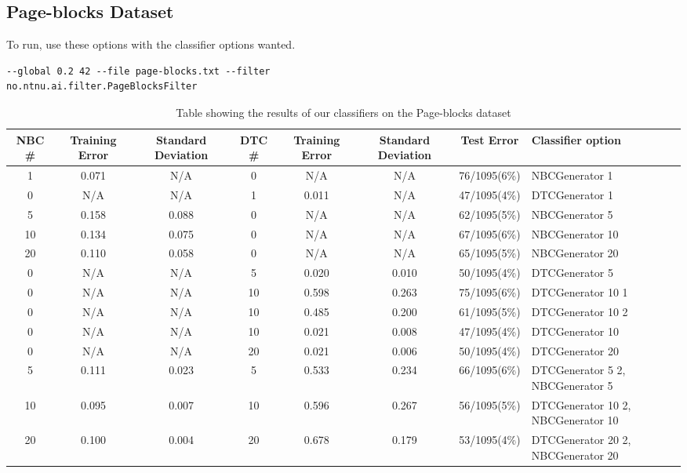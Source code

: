 \subsection{Page-blocks Dataset}\label{pblocks}


To run, use these options with the classifier options wanted.

\begin{lstlisting}[label=lst:pblocks, caption=Page-blocks dataset general 
options]
--global 0.2 42 --file page-blocks.txt --filter 
no.ntnu.ai.filter.PageBlocksFilter
\end{lstlisting}

\begin{landscape}
\begin{table}
\begin{tabular}{|c|c|c||c|c|c||c||p{5cm}|}
\hline
NBC \# & Training Error & Standard Deviation & DTC \# & Training Error
& Standard Deviation & Test Error & Classifier option \\ \hline
1 & 0.071 & N/A & 0 & N/A & N/A & 76/1095(6\%) & NBCGenerator 1 \\ \hline
0 & N/A & N/A & 1 & 0.011 & N/A & 47/1095(4\%) & DTCGenerator 1 \\ \hline
5 & 0.158 & 0.088 & 0 & N/A & N/A & 62/1095(5\%) & NBCGenerator 5 \\ \hline
10 & 0.134 & 0.075 & 0 & N/A & N/A & 67/1095(6\%) & NBCGenerator 10 \\ \hline
20 & 0.110 & 0.058 & 0 & N/A & N/A & 65/1095(5\%) & NBCGenerator 20 \\ \hline
0 & N/A & N/A & 5 & 0.020 & 0.010 & 50/1095(4\%) & DTCGenerator 5 \\ \hline
0 & N/A & N/A & 10 & 0.598 & 0.263 & 75/1095(6\%) & DTCGenerator 10 1 \\ \hline
0 & N/A & N/A & 10 & 0.485 & 0.200 & 61/1095(5\%) & DTCGenerator 10 2 \\ \hline
0 & N/A & N/A & 10 & 0.021 & 0.008 & 47/1095(4\%) & DTCGenerator 10 \\ \hline
0 & N/A & N/A & 20 & 0.021 & 0.006 & 50/1095(4\%) & DTCGenerator 20 \\ \hline
5 & 0.111 & 0.023 & 5 & 0.533 & 0.234 & 66/1095(6\%) & DTCGenerator 5 2, 
\newline NBCGenerator 5 \\ \hline
10 & 0.095 & 0.007 & 10 & 0.596 & 0.267 & 56/1095(5\%) & DTCGenerator 10 2, 
\newline NBCGenerator 10 \\ \hline
20 & 0.100 & 0.004 & 20 & 0.678 & 0.179 & 53/1095(4\%) & DTCGenerator 20 2, 
\newline NBCGenerator 20 \\ \hline
\hline
\end{tabular}
\label{tab:pblocks}
\caption[Page-blocks dataset boosting]{Table showing the results of our 
classifiers on the Page-blocks 
dataset}
\end{table}
\end{landscape}
